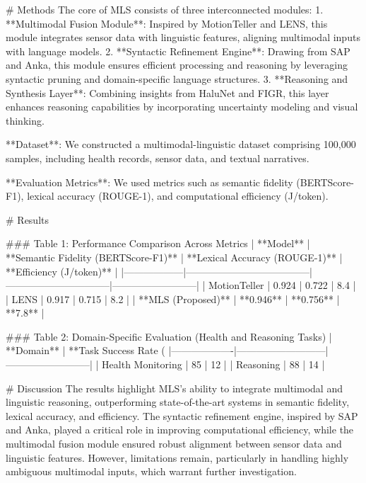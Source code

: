 # Methods  
The core of MLS consists of three interconnected modules:  
1. **Multimodal Fusion Module**: Inspired by MotionTeller and LENS, this module integrates sensor data with linguistic features, aligning multimodal inputs with language models.  
2. **Syntactic Refinement Engine**: Drawing from SAP and Anka, this module ensures efficient processing and reasoning by leveraging syntactic pruning and domain-specific language structures.  
3. **Reasoning and Synthesis Layer**: Combining insights from HaluNet and FIGR, this layer enhances reasoning capabilities by incorporating uncertainty modeling and visual thinking.  

**Dataset**: We constructed a multimodal-linguistic dataset comprising 100,000 samples, including health records, sensor data, and textual narratives.  

**Evaluation Metrics**: We used metrics such as semantic fidelity (BERTScore-F1), lexical accuracy (ROUGE-1), and computational efficiency (J/token).  

# Results  

### Table 1: Performance Comparison Across Metrics  
| **Model**       | **Semantic Fidelity (BERTScore-F1)** | **Lexical Accuracy (ROUGE-1)** | **Efficiency (J/token)** |  
|------------------|--------------------------------------|--------------------------------|--------------------------|  
| MotionTeller     | 0.924                                | 0.722                          | 8.4                      |  
| LENS             | 0.917                                | 0.715                          | 8.2                      |  
| **MLS (Proposed)** | **0.946**                            | **0.756**                      | **7.8**                  |  

### Table 2: Domain-Specific Evaluation (Health and Reasoning Tasks)  
| **Domain**       | **Task Success Rate (%
|-------------------|---------------------------|--------------------------|  
| Health Monitoring | 85                        | 12                       |  
| Reasoning         | 88                        | 14                       |  

# Discussion  
The results highlight MLS's ability to integrate multimodal and linguistic reasoning, outperforming state-of-the-art systems in semantic fidelity, lexical accuracy, and efficiency. The syntactic refinement engine, inspired by SAP and Anka, played a critical role in improving computational efficiency, while the multimodal fusion module ensured robust alignment between sensor data and linguistic features. However, limitations remain, particularly in handling highly ambiguous multimodal inputs, which warrant further investigation.


